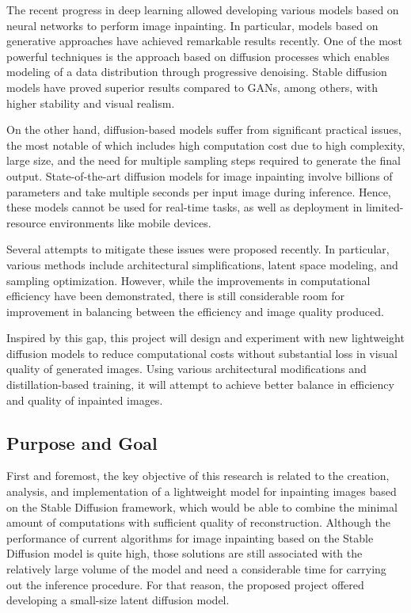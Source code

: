 \documentclass[journal]{IEEEtran}
\begin{document}
The recent progress in deep learning allowed developing various models based on neural networks to perform image inpainting. In particular, models based on generative approaches have achieved remarkable results recently. One of the most powerful techniques is the approach based on diffusion processes which enables modeling of a data distribution through progressive denoising. Stable diffusion models have proved superior results compared to GANs, among others, with higher stability and visual realism.

On the other hand, diffusion-based models suffer from significant practical issues, the most notable of which includes high computation cost due to high complexity, large size, and the need for multiple sampling steps required to generate the final output. State-of-the-art diffusion models for image inpainting involve billions of parameters and take multiple seconds per input image during inference. Hence, these models cannot be used for real-time tasks, as well as deployment in limited-resource environments like mobile devices.

Several attempts to mitigate these issues were proposed recently. In particular, various methods include architectural simplifications, latent space modeling, and sampling optimization. However, while the improvements in computational efficiency have been demonstrated, there is still considerable room for improvement in balancing between the efficiency and image quality produced.

Inspired by this gap, this project will design and experiment with new lightweight diffusion models to reduce computational costs without substantial loss in visual quality of generated images. Using various architectural modifications and distillation-based training, it will attempt to achieve better balance in efficiency and quality of inpainted images.

\subsection{Purpose and Goal}
First and foremost, the key objective of this research is related to the creation, analysis, and implementation of a lightweight model for inpainting images based on the Stable Diffusion framework, which would be able to combine the minimal amount of computations with sufficient quality of reconstruction. Although the performance of current algorithms for image inpainting based on the Stable Diffusion model is quite high, those solutions are still associated with the relatively large volume of the model and need a considerable time for carrying out the inference procedure. For that reason, the proposed project offered developing a small-size latent diffusion model.
\end{document}
